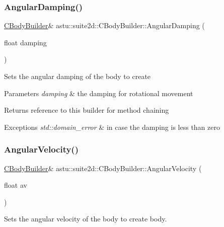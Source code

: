 \subsubsection{\texorpdfstring{Angular\+Damping()}{AngularDamping()}}
{\footnotesize\ttfamily \hyperlink{classastu_1_1suite2d_1_1CBodyBuilder}{C\+Body\+Builder}\& astu\+::suite2d\+::\+C\+Body\+Builder\+::\+Angular\+Damping (\begin{DoxyParamCaption}\item[{float}]{damping }\end{DoxyParamCaption})\hspace{0.3cm}{\ttfamily [inline]}}

Sets the angular damping of the body to create


\begin{DoxyParams}{Parameters}
{\em damping} & the damping for rotational movement \\
\hline
\end{DoxyParams}
\begin{DoxyReturn}{Returns}
reference to this builder for method chaining 
\end{DoxyReturn}

\begin{DoxyExceptions}{Exceptions}
{\em std\+::domain\+\_\+error} & in case the damping is less than zero \\
\hline
\end{DoxyExceptions}
\mbox{\label{classastu_1_1suite2d_1_1CBodyBuilder_a7a8919a8033bc348a4aba8b215db8351}} 
\subsubsection{\texorpdfstring{Angular\+Velocity()}{AngularVelocity()}}
{\footnotesize\ttfamily \hyperlink{classastu_1_1suite2d_1_1CBodyBuilder}{C\+Body\+Builder}\& astu\+::suite2d\+::\+C\+Body\+Builder\+::\+Angular\+Velocity (\begin{DoxyParamCaption}\item[{float}]{av }\end{DoxyParamCaption})\hspace{0.3cm}{\ttfamily [inline]}}

Sets the angular velocity of the body to create body.


